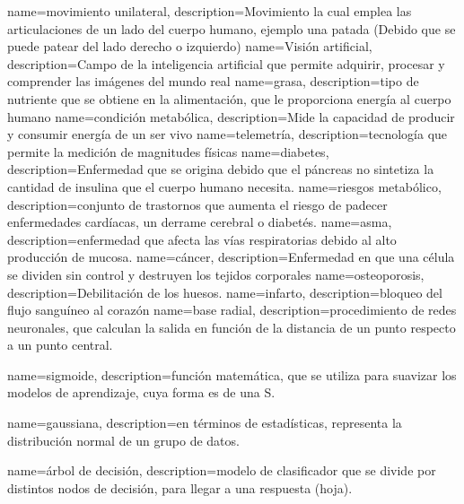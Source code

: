  {
 name={movimiento unilateral},
 description={Movimiento la cual emplea las articulaciones de un lado del cuerpo humano, ejemplo una patada (Debido que se puede patear del lado derecho o izquierdo)}
 }
 {
 name={Visi\'on artificial},
 description={Campo de la  inteligencia artificial que permite adquirir, procesar y comprender las im\'agenes del mundo real}
 }
 {
 name={grasa},
 description={tipo de nutriente que se obtiene en la alimentaci\'on, que le proporciona energ\'ia al cuerpo humano}
 }
 {
 name={condici\'on metab\'olica},
 description={Mide la capacidad de producir y consumir energ\'ia de un ser vivo}
 }
 {
 name={telemetr\'ia},
 description={tecnolog\'ia que permite la medici\'on de magnitudes f\'isicas}
 }
 {
 name={diabetes},
 description={Enfermedad que se origina debido que el p\'ancreas no sintetiza la cantidad de insulina que el cuerpo humano necesita.}
 }
 {
 name={riesgos metab\'olico},
 description={conjunto de trastornos que aumenta el riesgo de padecer enfermedades card\'iacas, un derrame cerebral o diabet\'es.}
 }
 {
 name={asma},
 description={enfermedad que afecta las v\'ias respiratorias debido al alto producci\'on de mucosa.}
 }
 {
 name={c\'ancer},
 description={Enfermedad en que una c\'elula se dividen sin control y destruyen los tejidos corporales}
 }
 {
 name={osteoporosis},
 description={Debilitaci\'on de los huesos. }
 }
 {
 name={infarto},
 description={bloqueo del flujo sangu\'ineo al coraz\'on}
 }
 {
 name={base radial},
 description={procedimiento de redes neuronales, que calculan la salida en funci\'on de la distancia de un punto respecto a un punto central. }
 }
 
 {
 name={sigmoide},
 description={funci\'on matem\'atica, que se utiliza para suavizar los modelos de aprendizaje, cuya forma es de una S. }
 }
 
 {
 name={gaussiana},
 description={en t\'erminos de estad\'isticas, representa la distribuci\'on normal de un grupo de datos.}
 }
 
 {
 name={\'arbol de decisi\'on},
 description={modelo de clasificador que se divide por distintos nodos de decisi\'on, para llegar a una respuesta (hoja).}
 }
 
